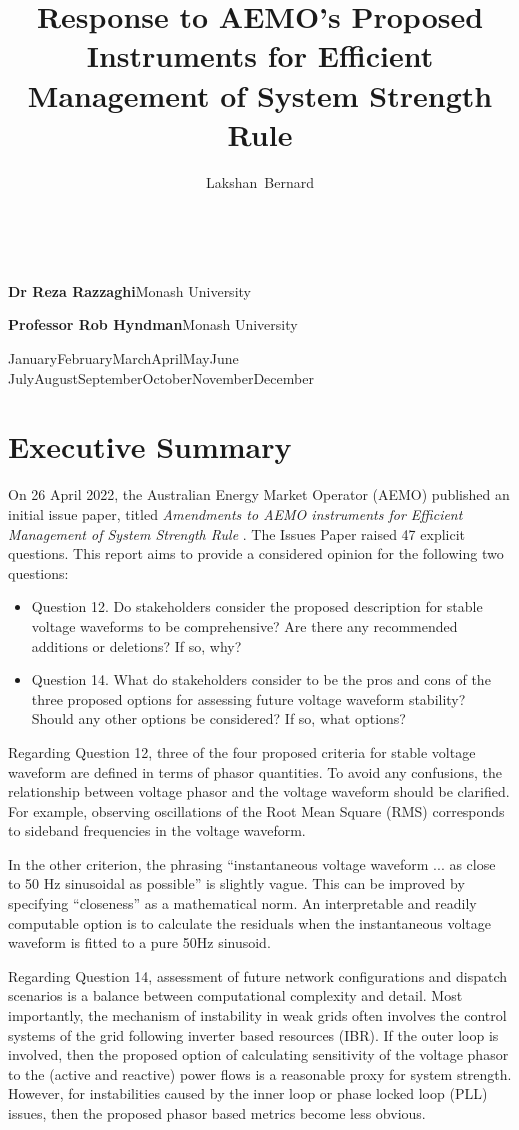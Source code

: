 \documentclass[11pt,a4paper,]{article}
\title{Response to AEMO's Proposed Instruments for Efficient Management of System Strength Rule}
\author{Lakshan~Bernard}
\date{\sf\Date~\Month~\Year}
\makeatletter
\def\Month{\ifcase\month\or
 January\or February\or March\or April\or May\or June\or
 July\or August\or September\or October\or November\or December\fi}
\def\Year{\number\year}
\def\cover{{\sffamily\setcounter{page}{0}
        \thispagestyle{empty}
        \vspace*{1cm}
        \begin{center}\Large
        \end{center}\vspace{1cm}
        \begin{center}
        \fbox{\parbox{14cm}{\begin{onehalfspace}\centering\Huge\vspace*{0.3cm}
                \textsf{\textbf{\expandafter{\@title}}}
				\end{onehalfspace}
        }}
        \end{center}
		\vspace{3cm}
		\hspace{1cm}\parbox{14cm}{\sffamily\large\@addresses}\vfill
		\hspace{1cm}\parbox{7cm}{\sffamily\large \textbf{Dr Reza Razzaghi}\newline Monash University}%
		\parbox{7cm}{\sffamily\large \textbf{Professor Rob Hyndman}\newline Monash University}\vspace{5cm}
        \vfill
		

                \begin{center}\Large
                \Month~\Year\\[1cm]
        \end{center}
		}}
\def\blindtitle{{\sffamily
     \thispagestyle{plain}%
        }}
\def\titlepage{{\cover\newpage\blindtitle}}
\let\maketitle\titlepage
\def\placefig#1#2#3#4{\begin{textblock}{.1}(#1,#2)\rlap{\texttt{[image: \#4]}}\end{textblock}}
\makeatother
\begin{document}
\maketitle

\section*{Executive Summary}
On 26 April 2022, the Australian Energy Market Operator (AEMO) published an initial issue paper, titled \emph{Amendments to AEMO instruments for Efficient Management of System Strength Rule} \cite{aemossrmiag}. The Issues Paper raised 47 explicit questions. This report aims to provide a considered opinion for the following two questions:

\begin{itemize}
\item{Question 12. Do stakeholders consider the proposed description for stable voltage waveforms to be comprehensive? Are there any recommended additions or deletions? If so, why?}
\item{Question 14. What do stakeholders consider to be the pros and cons of the three proposed options for assessing future voltage waveform stability? Should any other options be considered? If so, what options?}
\end{itemize}

Regarding Question 12, three of the four proposed criteria for stable voltage waveform are defined in terms of phasor quantities. To avoid any confusions, the relationship between voltage phasor and the voltage waveform should be clarified. For example, observing oscillations of the Root Mean Square (RMS) corresponds to sideband frequencies in the voltage waveform.

In the other criterion, the phrasing ``instantaneous voltage waveform ... as close to 50 Hz sinusoidal as possible'' is slightly vague. This can be improved by specifying ``closeness'' as a mathematical norm. An interpretable and readily computable option is to calculate the residuals when the instantaneous voltage waveform is fitted to a pure 50Hz sinusoid.

Regarding Question 14, assessment of future network configurations and dispatch scenarios is a balance between computational complexity and detail. Most importantly, the mechanism of instability in weak grids often involves the control systems of the grid following inverter based resources (IBR). If the outer loop is involved, then the proposed option of calculating sensitivity of the voltage phasor to the (active and reactive) power flows is a reasonable proxy for system strength. However, for instabilities caused by the inner loop or phase locked loop (PLL) issues, then the proposed phasor based metrics become less obvious.
\end{document}
